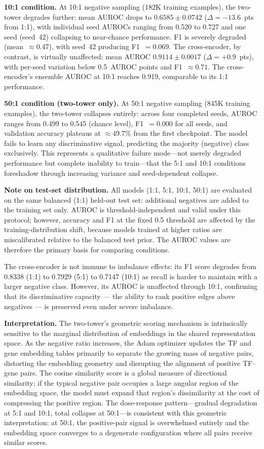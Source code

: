 \documentclass[journal]{IEEEtran}
\begin{document}
\textbf{10:1 condition.}
At 10:1 negative sampling (182K training examples), the two-tower degrades
further: mean AUROC drops to $0.6585 \pm 0.0742$ ($\Delta = -13.6$~pts from
1:1), with individual seed AUROCs ranging from 0.520 to 0.727 and one seed
(seed~42) collapsing to near-chance performance. F1 is severely degraded
(mean~$\approx$0.47), with seed~42 producing F1~$= 0.069$. The cross-encoder,
by contrast, is virtually unaffected: mean AUROC $0.9114 \pm 0.0017$
($\Delta = +0.9$~pts), with per-seed variation below 0.5~AUROC points and
F1~$\approx 0.71$. The cross-encoder's ensemble AUROC at 10:1 reaches 0.919,
comparable to its 1:1 performance.

\textbf{50:1 condition (two-tower only).}
At 50:1 negative sampling (845K training examples), the two-tower collapses
entirely: across four completed seeds, AUROC ranges from 0.499 to 0.545
(chance level), F1~$= 0.000$ for all seeds, and validation accuracy plateaus
at $\approx$49.7\% from the first checkpoint. The model fails to learn any
discriminative signal, predicting the majority (negative) class exclusively.
This represents a qualitative failure mode---not merely degraded performance
but complete inability to train---that the 5:1 and 10:1 conditions
foreshadow through increasing variance and seed-dependent collapse.

\textbf{Note on test-set distribution.}
All models (1:1, 5:1, 10:1, 50:1) are evaluated on the same balanced (1:1)
held-out test set: additional negatives are added to the training set only.
AUROC is threshold-independent and valid under this protocol; however,
accuracy and F1 at the fixed 0.5 threshold are affected by the
training-distribution shift, because models trained at higher ratios are
miscalibrated relative to the balanced test prior. The AUROC values are
therefore the primary basis for comparing conditions.

The cross-encoder is not immune to imbalance effects: its F1 score degrades
from 0.8338 (1:1) to 0.7929 (5:1) to 0.7147 (10:1) as recall is harder to
maintain with a larger negative class. However, its AUROC is unaffected
through 10:1, confirming that its discriminative capacity --- the ability to
rank positive edges above negatives --- is preserved even under severe
imbalance.

\textbf{Interpretation.} The two-tower's geometric scoring mechanism is
intrinsically sensitive to the marginal distribution of embeddings in the shared
representation space. As the negative ratio increases, the Adam optimizer
updates the TF and gene embedding tables primarily to separate the growing mass
of negative pairs, distorting the embedding geometry and disrupting the
alignment of positive TF--gene pairs. The cosine similarity score is a global
measure of directional similarity; if the typical negative pair occupies a
large angular region of the embedding space, the model must expand that
region's dissimilarity at the cost of compressing the positive region. The
dose-response pattern---gradual degradation at 5:1 and 10:1, total collapse at
50:1---is consistent with this geometric interpretation: at 50:1, the
positive-pair signal is overwhelmed entirely and the embedding space converges
to a degenerate configuration where all pairs receive similar scores.
\end{document}
